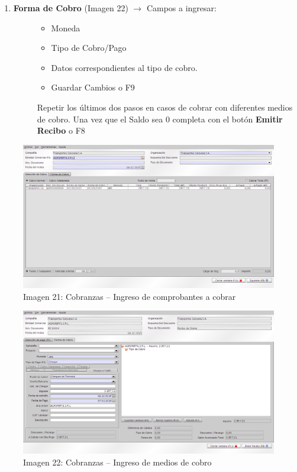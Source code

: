 \documentclass[letterpaper,10pt,spanish]{sphinxmanual}
\begin{document}
\begin{enumerate}
\begin{description}
\end{description}

\item {} \begin{description}
\item[{\textbf{Forma de Cobro} (Imagen 22) \(\rightarrow\) Campos a ingresar:}] \leavevmode\begin{itemize}
\item {} 
Moneda

\item {} 
Tipo de Cobro/Pago

\item {} 
Datos correspondientes al tipo de cobro.

\item {} 
Guardar Cambios o F9

\end{itemize}

Repetir los últimos dos pasos en casos de cobrar con diferentes medios de cobro.
Una vez que el Saldo sea 0 completa con el botón \textbf{Emitir Recibo} o F8

\end{description}

\end{enumerate}
\begin{figure}[htbp]
\centering
\capstart

\includegraphics{ly_ventas21.png}
\caption{Imagen 21: Cobranzas – Ingreso de comprobantes a cobrar}\end{figure}
\begin{figure}[htbp]
\centering
\capstart

\includegraphics{ly_ventas22.png}
\caption{Imagen 22: Cobranzas – Ingreso de medios de cobro}\end{figure}
\end{document}
